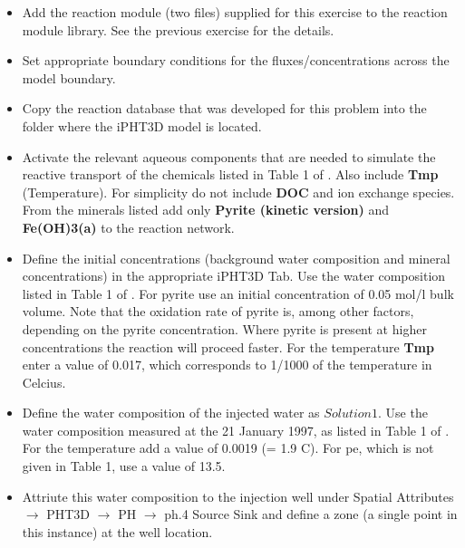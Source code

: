 \begin{itemize}

\item Add the reaction module (two files) supplied for this exercise to the reaction module library. See the previous exercise for the details. 

\item Set appropriate boundary conditions for the fluxes/concentrations across the model boundary. 

\item Copy the reaction database that was developed for this problem into the folder where the iPHT3D model is located. 

\item Activate the relevant aqueous components that are needed to simulate the reactive transport of the chemicals listed in Table 1 of \cite{prommer_stuyfzand_2005}. Also include  {\color{red} \textbf{Tmp}} (Temperature). 
For simplicity do not include  {\color{red} \textbf{DOC}} and ion exchange species. 
From the minerals listed add only  {\color{red} \textbf{Pyrite (kinetic version)}} 
and \\ {\color{red} \textbf{Fe(OH)3(a)}} to the reaction network.  

\item Define the initial concentrations (background water composition and mineral concentrations)
in the appropriate iPHT3D Tab. Use the 
water composition listed in Table 1 of \cite{prommer_stuyfzand_2005}.
For pyrite use an initial concentration of 0.05 mol/l bulk volume.
Note that the oxidation rate of pyrite is, among other factors, depending on the 
pyrite concentration. Where pyrite is present at higher concentrations the reaction
will proceed faster. For the temperature {\color{red} \textbf{Tmp}} enter a value of 0.017, which
corresponds to 1/1000 of the temperature in Celcius.

\item Define the water composition of the injected water as $Solution 1$.
Use the water composition measured at the 21 January 1997, as
listed in Table 1 of \cite{prommer_stuyfzand_2005}. For the temperature add a
value of 0.0019 (= 1.9 C). For pe, which is not given in Table 1, use a value of 13.5.
 
\item Attriute this water composition to the injection well 
under {\color{blue}Spatial Attributes} $\rightarrow$ {\color{blue}PHT3D} $\rightarrow$ {\color{blue}PH} $\rightarrow$ {\color{blue}ph.4 Source \/ Sink} and define a zone 
(a single point in this instance) at the well location. 


\end{itemize}
